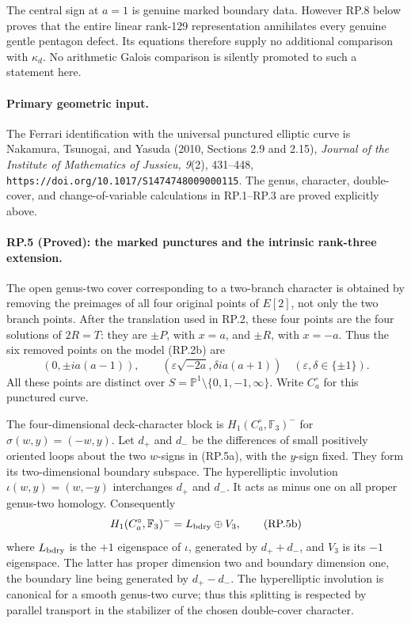The central sign at $a=1$ is genuine marked
boundary data. However RP.8 below proves that
the entire linear rank-129 representation
annihilates every genuine gentle pentagon
defect. Its equations therefore supply no
additional comparison with $\kappa_d$.
No arithmetic Galois comparison is silently
promoted to such a statement here.

\paragraph{Primary geometric input.}
The Ferrari identification with the universal
punctured elliptic curve is Nakamura, Tsunogai,
and Yasuda (2010, Sections 2.9 and 2.15),
\emph{Journal of the Institute of Mathematics
of Jussieu, 9}(2), 431--448,
\texttt{https://doi.org/10.1017/S1474748009000115}.
The genus, character, double-cover, and change-of-variable
calculations in RP.1--RP.3 are proved explicitly above.

\paragraph{RP.5 (Proved): the marked punctures and the intrinsic rank-three extension.}
The open genus-two cover corresponding to a two-branch
character is obtained by removing the preimages of all
four original points of $E[2]$, not only the two branch
points. After the translation used in RP.2, these four
points are the four solutions of $2R=T$: they are
$\pm P$, with $x=a$, and $\pm R$, with $x=-a$.
Thus the six removed points on the model (RP.2b) are
\[
 (0,\pm i a(a-1)),\qquad
 (\varepsilon\sqrt{-2a},\delta i a(a+1))
       \quad(\varepsilon,\delta\in\{\pm1\}).
 \tag{RP.5a}
\]
All these points are distinct over
$S=\mathbb P^1\setminus\{0,1,-1,\infty\}$.
Write $C_a^\circ$ for this punctured curve.

The four-dimensional deck-character block is
$H_1(C_a^\circ,\mathbb F_3)^-$ for
$\sigma(w,y)=(-w,y)$. Let $d_+$ and $d_-$ be the
differences of small positively oriented loops about
the two $w$-signs in (RP.5a), with the $y$-sign fixed.
They form its two-dimensional boundary subspace.
The hyperelliptic involution $\iota(w,y)=(w,-y)$
interchanges $d_+$ and $d_-$. It acts as minus one
on all proper genus-two homology. Consequently
\[
 H_1(C_a^\circ,\mathbb F_3)^-
       =L_{\rm bdry}\oplus V_3,
 \tag{RP.5b}
\]
where $L_{\rm bdry}$ is the $+1$ eigenspace of
$\iota$, generated by $d_++d_-$, and $V_3$ is its
$-1$ eigenspace. The latter has proper dimension
two and boundary dimension one, the boundary line
being generated by $d_+-d_-$. The hyperelliptic
involution is canonical for a smooth genus-two
curve; thus this splitting is respected by
parallel transport in the stabilizer of the
chosen double-cover character.

